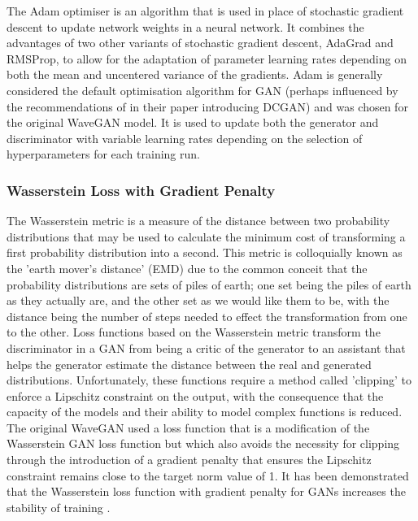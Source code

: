 \documentclass[a4paper, titlepage]{article}
\begin{document}
The Adam optimiser is an algorithm that is used in place of stochastic gradient descent to update network weights in a neural network.
It combines the advantages of two other variants of stochastic gradient descent, AdaGrad and RMSProp, to allow for the adaptation of parameter learning rates depending on both the mean and uncentered variance of the gradients.
\newline
\newline
Adam is generally considered the default optimisation algorithm for \ac{GAN} (perhaps influenced by the recommendations of \citeauthor{2015arXiv151106434R} in their paper introducing \ac{DCGAN}) and was chosen for the original WaveGAN model.
It is used to update both the generator and discriminator with variable learning rates depending on the selection of hyperparameters for each training run.

\subsubsection{Wasserstein Loss with Gradient Penalty}

The Wasserstein metric is a measure of the distance between two probability distributions that may be used to calculate the minimum cost of transforming a first probability distribution into a second.
This metric is colloquially known as the 'earth mover's distance' (EMD) due to the common conceit that the probability distributions are sets of piles of earth; one set being the piles of earth as they actually are, and the other set as we would like them to be, with the distance being the number of steps needed to effect the transformation from one to the other.
\newline
\newline
Loss functions based on the Wasserstein metric transform the discriminator in a \ac{GAN} from being a critic of the generator to an assistant that helps the generator estimate the distance between the real and generated distributions.
Unfortunately, these functions require a method called 'clipping' to enforce a Lipschitz constraint on the output, with the consequence that the capacity of the models and their ability to model complex functions is reduced.
\newline
\newline
The original WaveGAN used a loss function that is a modification of the Wasserstein GAN loss function but which also avoids the necessity for clipping through the introduction of a gradient penalty that ensures the Lipschitz constraint remains close to the target norm value of 1.
It has been demonstrated that the Wasserstein loss function with gradient penalty for \ac{GAN}s increases the stability of training \citep{2017arXiv170400028G}.
\end{document}

